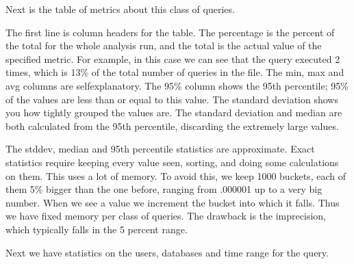 \documentclass[letterpaper,10pt,english]{sphinxmanual}
\begin{document}
Next is the table of metrics about this class of queries.

\begin{sphinxVerbatim}[commandchars=\\\{\}]
\end{sphinxVerbatim}

The first line is column headers for the table.  The percentage is the percent
of the total for the whole analysis run, and the total is the actual value of
the specified metric.  For example, in this case we can see that the query
executed 2 times, which is 13\% of the total number of queries in the file.  The
min, max and avg columns are self\sphinxhyphen{}explanatory.  The 95\% column shows the 95th
percentile; 95\% of the values are less than or equal to this value.  The
standard deviation shows you how tightly grouped the values are.  The standard
deviation and median are both calculated from the 95th percentile, discarding
the extremely large values.

The stddev, median and 95th percentile statistics are approximate.  Exact
statistics require keeping every value seen, sorting, and doing some
calculations on them.  This uses a lot of memory.  To avoid this, we keep 1000
buckets, each of them 5\% bigger than the one before, ranging from .000001 up to
a very big number.  When we see a value we increment the bucket into which it
falls.  Thus we have fixed memory per class of queries.  The drawback is the
imprecision, which typically falls in the 5 percent range.

Next we have statistics on the users, databases and time range for the query.

\begin{sphinxVerbatim}[commandchars=\\\{\}]
\end{sphinxVerbatim}
\end{document}
